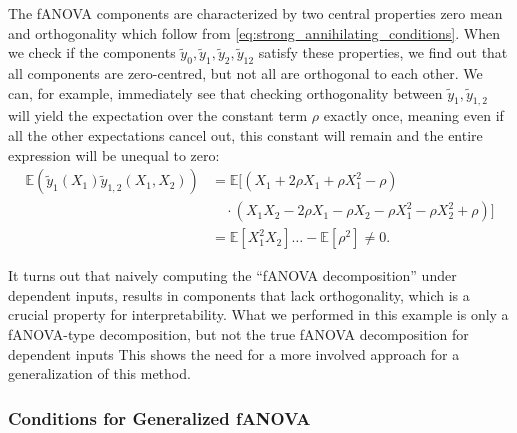 The fANOVA components are characterized by two central properties zero mean and orthogonality which follow from \autoref{eq:strong_annihilating_conditions}.
When we check if the components $\tilde{y}_0, \tilde{y}_1, \tilde{y}_2, \tilde{y}_{12}$ satisfy these properties, we find out that all components are zero-centred, but not all are orthogonal to each other. We can, for example, immediately see that checking orthogonality between $\tilde{y}_{1}, \tilde{y}_{1,2}$ will yield the expectation over the constant term $\rho$ exactly once, meaning even if all the other expectations cancel out, this constant will remain and the entire expression will be unequal to zero:
\begin{align*}
    \mathbb{E}(\tilde{y}_1(X_1)\tilde{y}_{1,2}(X_1, X_2)) 
    &= \mathbb{E}[(X_1 + 2\rho X_1 + \rho X_1^2 - \rho) \\
    &\quad \cdot (X_1 X_2 - 2\rho X_1 - \rho X_2 - \rho X_1^2 - \rho X_2^2 + \rho)] \\
    &= \mathbb{E}[X_{1}^2X_2] \ldots - \mathbb{E}[\rho^2] \neq 0.
\end{align*}

It turns out that naively computing the ``fANOVA decomposition'' under dependent inputs, results in components that lack orthogonality, which is a crucial property for interpretability.
What we performed in this example is only a fANOVA-type decomposition, but not the true fANOVA decomposition for dependent inputs
This shows the need for a more involved approach for a generalization of this method.

\subsubsection{Conditions for Generalized fANOVA}

